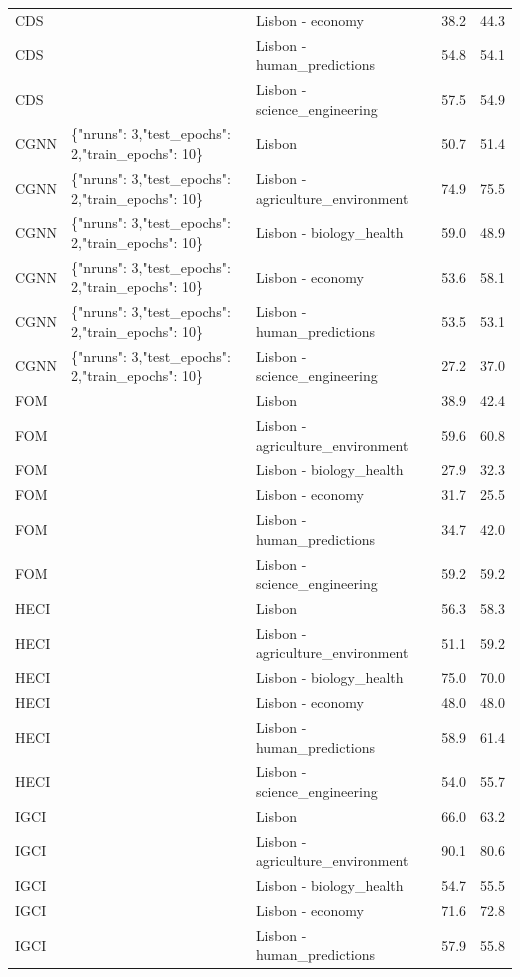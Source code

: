 \begin{tabular}{lllll}
CDS &  & Lisbon - economy & 38.2 & 44.3 \\
CDS &  & Lisbon - human\_predictions & 54.8 & 54.1 \\
CDS &  & Lisbon - science\_engineering & 57.5 & 54.9 \\
CGNN & \{"nruns": 3,"test\_epochs": 2,"train\_epochs": 10\} & Lisbon & 50.7 & 51.4 \\
CGNN & \{"nruns": 3,"test\_epochs": 2,"train\_epochs": 10\} & Lisbon - agriculture\_environment & 74.9 & 75.5 \\
CGNN & \{"nruns": 3,"test\_epochs": 2,"train\_epochs": 10\} & Lisbon - biology\_health & 59.0 & 48.9 \\
CGNN & \{"nruns": 3,"test\_epochs": 2,"train\_epochs": 10\} & Lisbon - economy & 53.6 & 58.1 \\
CGNN & \{"nruns": 3,"test\_epochs": 2,"train\_epochs": 10\} & Lisbon - human\_predictions & 53.5 & 53.1 \\
CGNN & \{"nruns": 3,"test\_epochs": 2,"train\_epochs": 10\} & Lisbon - science\_engineering & 27.2 & 37.0 \\
FOM &  & Lisbon & 38.9 & 42.4 \\
FOM &  & Lisbon - agriculture\_environment & 59.6 & 60.8 \\
FOM &  & Lisbon - biology\_health & 27.9 & 32.3 \\
FOM &  & Lisbon - economy & 31.7 & 25.5 \\
FOM &  & Lisbon - human\_predictions & 34.7 & 42.0 \\
FOM &  & Lisbon - science\_engineering & 59.2 & 59.2 \\
HECI &  & Lisbon & 56.3 & 58.3 \\
HECI &  & Lisbon - agriculture\_environment & 51.1 & 59.2 \\
HECI &  & Lisbon - biology\_health & 75.0 & 70.0 \\
HECI &  & Lisbon - economy & 48.0 & 48.0 \\
HECI &  & Lisbon - human\_predictions & 58.9 & 61.4 \\
HECI &  & Lisbon - science\_engineering & 54.0 & 55.7 \\
IGCI &  & Lisbon & 66.0 & 63.2 \\
IGCI &  & Lisbon - agriculture\_environment & 90.1 & 80.6 \\
IGCI &  & Lisbon - biology\_health & 54.7 & 55.5 \\
IGCI &  & Lisbon - economy & 71.6 & 72.8 \\
IGCI &  & Lisbon - human\_predictions & 57.9 & 55.8 \\

\end{tabular}
